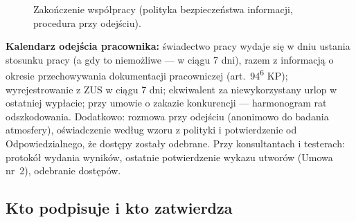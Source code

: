 \documentclass[11pt,a4paper]{report}
\begin{document}
\begin{figure}[H]
\centering
{}
\caption{Zakończenie współpracy (polityka bezpieczeństwa informacji, procedura przy odejściu).}
\end{figure}

\begin{DlaHR}
\textbf{Kalendarz odejścia pracownika:} świadectwo pracy wydaje się w dniu ustania stosunku pracy (a gdy to niemożliwe --- w ciągu 7 dni), razem z informacją o okresie przechowywania dokumentacji pracowniczej (art.~94\textsuperscript{6} KP); wyrejestrowanie z ZUS w ciągu 7 dni; ekwiwalent za niewykorzystany urlop w ostatniej wypłacie; przy umowie o zakazie konkurencji --- harmonogram rat odszkodowania. Dodatkowo: rozmowa przy odejściu (anonimowo do badania atmosfery), oświadczenie według wzoru z polityki i potwierdzenie od Odpowiedzialnego, że dostępy zostały odebrane. Przy konsultantach i testerach: protokół wydania wyników, ostatnie potwierdzenie wykazu utworów (Umowa nr~2), odebranie dostępów.
\end{DlaHR}

\subsection*{Kto podpisuje i kto zatwierdza}
\end{document}
